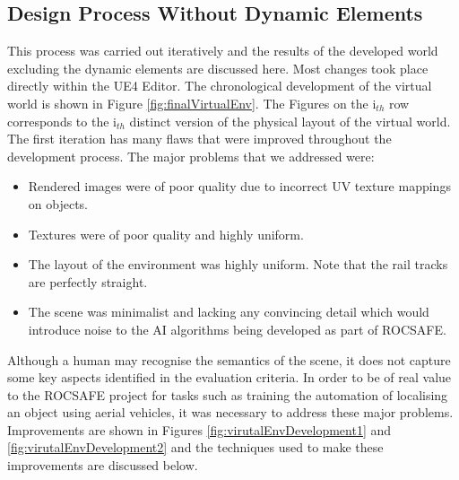 \subsection{Design Process Without Dynamic Elements}
This process was carried out iteratively and the results of the developed world excluding the dynamic elements are discussed here. Most changes took place directly within the UE4 Editor. The chronological development of the virtual world is shown in Figure \ref{fig:finalVirtualEnv}. The Figures on the i$_{th}$ row corresponds to the i$_{th}$ distinct version of the physical layout of the virtual world. The first iteration has many flaws that were improved throughout the development process. The major problems that we addressed were:
\begin{itemize}
    \item Rendered images were of poor quality due to incorrect UV texture mappings %
    on objects.
    \item Textures were of poor quality and highly uniform.
    \item The layout of the environment was highly uniform. Note that the rail tracks are perfectly straight.
    \item The scene was minimalist and lacking any convincing detail which would introduce noise to the AI algorithms being developed as part of ROCSAFE.
\end{itemize}
Although a human may recognise the semantics of the scene, it does not capture some key aspects identified in the evaluation criteria. In order to be of real value to the ROCSAFE project for tasks such as training the automation of localising an object using aerial vehicles, it was necessary to address these major problems. Improvements are shown in Figures \ref{fig:virutalEnvDevelopment1} and \ref{fig:virutalEnvDevelopment2} and the techniques used to make these improvements are discussed below.


